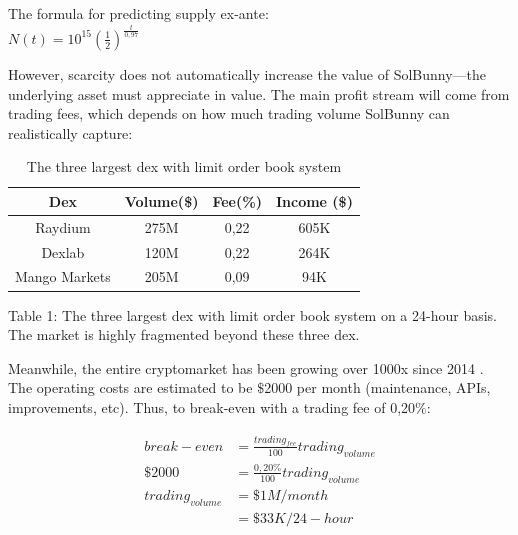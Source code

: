 \documentclass[12pt]{article}
\begin{document}
The formula for predicting supply ex-ante:\\

$N(t)=10^{15}(\frac{1}{2})^\frac{t}{0,97}$


However, scarcity does not automatically increase the value of SolBunny—the underlying asset must appreciate in value. The main profit stream will come from trading fees, which depends on how much trading volume SolBunny can realistically capture:

\begin{table}[ht]
\caption{The three largest dex with limit order book system}
\centering
\begin{tabular}{||c c c c||} 
 \hline
Dex & Volume(\$) &  Fee(\%) & Income (\$) \\ [0.5ex] 
 \hline\hline
 Raydium \cite{raydium} & 275M & 0,22 \cite{serum} & 605K \\ 
 \hline
 Dexlab \cite{dexlab} & 120M & 0,22 \cite{dexfee} & 264K \\
 \hline
Mango Markets \cite{mango} & 205M & 0,09 & 94K \\
 \hline
\end{tabular}
\label{Table 1}

Table 1: The three largest dex with limit order book system on a 24-hour basis. The market is highly fragmented beyond these three dex.
\end{table}

Meanwhile, the entire cryptomarket has been growing over 1000x since 2014 \cite{cryptovolume}. The operating costs are estimated to be $\$$2000 per month (maintenance, APIs, improvements, etc). Thus, to break-even with a trading fee of 0,20$\%$:

\begin{equation}\label{break-even}
\begin{split}
break-even &=\frac{trading_{fee}}{100} trading_{volume}\\
\$2000  &=\frac{0,20\%}{100} trading_{volume}\\
trading_{volume} &=\$1M/month\\
 &=\$33K/24-hour
\end{split}
\end{equation}
\\
\end{document}
